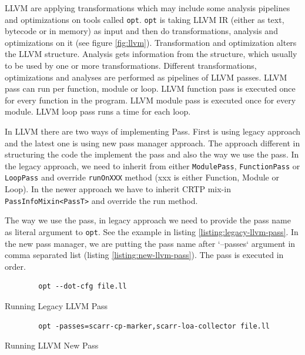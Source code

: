 LLVM are applying transformations \textemdash{} which may include some analysis pipelines \textemdash{} and optimizations on tools called \texttt{opt}. \texttt{opt} is taking LLVM IR (either as text, bytecode or in memory) as input and then do transformations, analysis and optimizations on it (see figure \ref{fig:llvm}). Transformation and optimization alters the LLVM structure. Analysis gets information from the structure, which usually to be used by one or more transformations. Different transformations, optimizations and analyses are performed as pipelines of LLVM passes. LLVM pass can run per function, module or loop. LLVM function pass is executed once for every function in the program. LLVM module pass is executed once for every module. LLVM loop pass runs a time for each loop.  


In LLVM there are two ways of implementing Pass. First is using legacy approach and the latest one is using new pass manager approach. The approach different in structuring the code the implement the pass and also the way we use the pass.  In the legacy approach, we need to inherit from either \texttt{ModulePass}, \texttt{FunctionPass} or \texttt{LoopPass} and override \texttt{runOnXXX} method (xxx is either Function, Module or Loop). In the newer approach we have to inherit CRTP mix-in \texttt{PassInfoMixin<PassT>} and override the run method.

The way we use the pass, in legacy approach we need to provide the pass name as literal argument to \texttt{opt}. See the example in listing \ref{listing:legacy-llvm-pass}. In the new pass manager, we are putting the pass name after `--passes` argument in comma separated list (listing \ref{listing:new-llvm-pass}). The pass is executed in order.

\begin{listing}[htbp]
    \begin{verbatim}
        opt --dot-cfg file.ll 
    \end{verbatim}
    \caption{Running Legacy LLVM Pass}    
    \label{listing:legacy-llvm-pass}
\end{listing}

\begin{listing}[htpb]
    \begin{verbatim}
        opt -passes=scarr-cp-marker,scarr-loa-collector file.ll 
    \end{verbatim}
\caption{Running LLVM New Pass}    
\label{listing:new-llvm-pass}
\end{listing}

